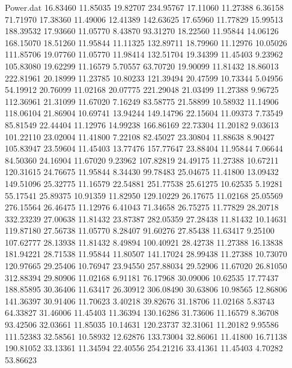 \begin{filecontents}{Power.dat}
  16.83460   11.85035   19.82707  234.95767
  17.11060   11.27388    6.36158   71.71970
  17.38360   11.49006   12.41389  142.63625
  17.65960   11.77829   15.99513  188.39532
  17.93660   11.05770    8.43870   93.31270
  18.22560   11.95844   14.06126  168.15070
  18.51260   11.95844   11.11325  132.89711
  18.79960   11.12976   10.05026  111.85706
  19.07760   11.05770   11.98414  132.51704
  19.34399   11.45403    9.23962  105.83080
  19.62299   11.16579    5.70557   63.70720
  19.90099   11.81432   18.86013  222.81961
  20.18999   11.23785   10.80233  121.39494
  20.47599   10.73344    5.04956   54.19912
  20.76099   11.02168   20.07775  221.29048
  21.03499   11.27388    9.96725  112.36961
  21.31099   11.67020    7.16249   83.58775
  21.58899   10.58932   11.14906  118.06104
  21.86904   10.69741   13.94244  149.14796
  22.15604   11.09373    7.73549   85.81549
  22.44404   11.12976   14.99238  166.86169
  22.73304   11.20182    9.03613  101.22110
  23.02004   11.41800    7.22108   82.45027
  23.30804   11.88638    8.90427  105.83947
  23.59604   11.45403   13.77476  157.77647
  23.88404   11.95844    7.06644   84.50360
  24.16904   11.67020    9.23962  107.82819
  24.49175   11.27388   10.67211  120.31615
  24.76675   11.95844    8.34430   99.78483
  25.04675   11.41800   13.09432  149.51096
  25.32775   11.16579   22.54881  251.77538
  25.61275   10.62535    5.19281   55.17541
  25.89375   10.91359   11.82950  129.10229
  26.17675   11.02168   25.05569  276.15564
  26.46475   11.12976    6.41043   71.34658
  26.75275   11.77829   28.20718  332.23239
  27.00638   11.81432   23.87387  282.05359
  27.28438   11.81432   10.14631  119.87180
  27.56738   11.05770    8.28407   91.60276
  27.85438   11.63417    9.25100  107.62777
  28.13938   11.81432    8.49894  100.40921
  28.42738   11.27388   16.13838  181.94221
  28.71538   11.95844   11.80507  141.17024
  28.99438   11.27388   10.73070  120.97665
  29.25406   10.76947   23.94550  257.88034
  29.52906   11.67020   26.81050  312.88394
  29.80906   11.02168    6.91181   76.17968
  30.09006   10.62535   17.77437  188.85895
  30.36406   11.63417   26.30912  306.08490
  30.63806   10.98565   12.86806  141.36397
  30.91406   11.70623    3.40218   39.82676
  31.18706   11.02168    5.83743   64.33827
  31.46006   11.45403   11.36394  130.16286
  31.73606   11.16579    8.36708   93.42506
  32.03661   11.85035   10.14631  120.23737
  32.31061   11.20182    9.95586  111.52383
  32.58561   10.58932   12.62876  133.73004
  32.86061   11.41800   16.71138  190.81052
  33.13361   11.34594   22.40556  254.21216
  33.41361   11.45403    4.70282   53.86623

\end{filecontents}

